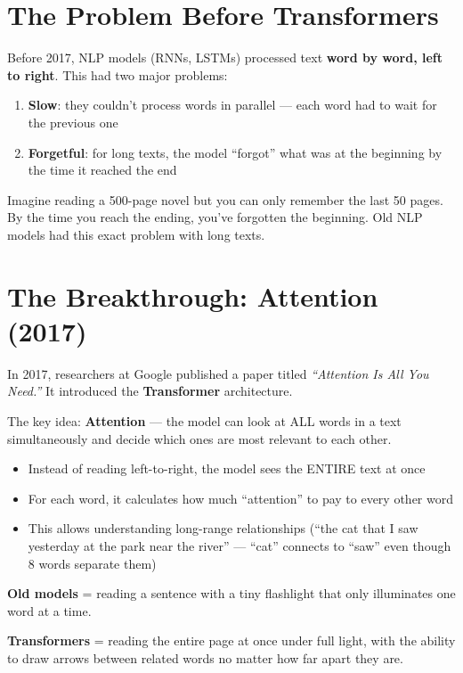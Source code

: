 \documentclass[11pt,a4paper]{report}
\begin{document}
\section{The Problem Before Transformers}

Before 2017, NLP models (RNNs, LSTMs) processed text \textbf{word by word, left to right}. This had two major problems:

\begin{enumerate}
    \item \textbf{Slow}: they couldn't process words in parallel --- each word had to wait for the previous one
    \item \textbf{Forgetful}: for long texts, the model ``forgot'' what was at the beginning by the time it reached the end
\end{enumerate}

\begin{analogybox}
Imagine reading a 500-page novel but you can only remember the last 50 pages. By the time you reach the ending, you've forgotten the beginning. Old NLP models had this exact problem with long texts.
\end{analogybox}

\section{The Breakthrough: Attention (2017)}

In 2017, researchers at Google published a paper titled \textit{``Attention Is All You Need.''} It introduced the \textbf{Transformer} architecture.

The key idea: \textbf{Attention} --- the model can look at ALL words in a text simultaneously and decide which ones are most relevant to each other.

\begin{itemize}
    \item Instead of reading left-to-right, the model sees the ENTIRE text at once
    \item For each word, it calculates how much ``attention'' to pay to every other word
    \item This allows understanding long-range relationships (``the cat that I saw yesterday at the park near the river'' --- ``cat'' connects to ``saw'' even though 8 words separate them)
\end{itemize}

\begin{analogybox}
\textbf{Old models} = reading a sentence with a tiny flashlight that only illuminates one word at a time.

\textbf{Transformers} = reading the entire page at once under full light, with the ability to draw arrows between related words no matter how far apart they are.
\end{analogybox}
\end{document}
